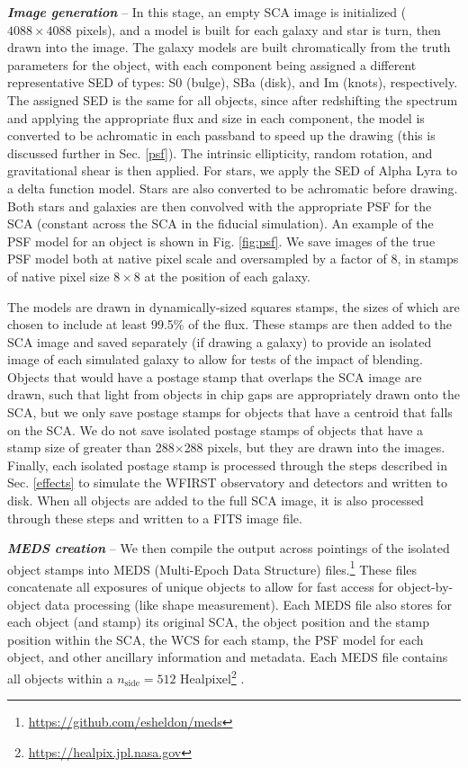 \documentclass[aps,prd, amsmath,amssymb,superscriptaddress,showkeys,nofootinbib,reprint,preprintnumbers]{revtex4-1}
\begin{document}
\textbf{\textit{Image generation}} -- In this stage, an empty SCA image is initialized ($4088\times4088$ pixels), and a model is built for each galaxy and star is turn, then drawn into the image. 
The galaxy models are built chromatically from the truth parameters for the object, with each component being assigned a different representative SED of types: S0 (bulge), SBa (disk), and Im (knots), respectively. 
The assigned SED is the same for all objects, since after redshifting the spectrum and applying the appropriate flux and size in each component, the model is converted to be achromatic in each passband to speed up the drawing (this is discussed further in Sec. \ref{psf}). 
The intrinsic ellipticity, random rotation, and gravitational shear is then applied.
For stars, we apply the SED of Alpha Lyra to a delta function model. 
Stars are also converted to be achromatic before drawing.
Both stars and galaxies are then convolved with the appropriate PSF for the SCA (constant across the SCA in the fiducial simulation). An example of the PSF model for an object is shown in Fig. \ref{fig:psf}. We save images of the true PSF model both at native pixel scale and oversampled by a factor of 8, in stamps of native pixel size $8\times 8$ at the position of each galaxy.

The models are drawn in dynamically-sized squares stamps, the sizes of which are chosen to include at least 99.5\% of the flux.
These stamps are then added to the SCA image and saved separately (if drawing a galaxy) to provide an isolated image of each simulated galaxy to allow for tests of the impact of blending.
Objects that would have a postage stamp that overlaps the SCA image are drawn, such that light from objects in chip gaps are appropriately drawn onto the SCA, but we only save postage stamps for objects that have a centroid that falls on the SCA. 
We do not save isolated postage stamps of objects that have a stamp size of greater than 288$\times$288 pixels, but they are drawn into the images.
Finally, each isolated postage stamp is processed through the steps described in Sec. \ref{effects} to simulate the WFIRST observatory and detectors and written to disk. When all objects are added to the full SCA image, it is also processed through these steps and written to a FITS image file.

\textbf{\textit{MEDS creation}} -- We then compile the output across pointings of the isolated object stamps into MEDS (Multi-Epoch Data Structure) files.\footnote{\url{https://github.com/esheldon/meds}}
These files concatenate all exposures of unique objects to allow for fast access for object-by-object data processing (like shape measurement). 
Each MEDS file also stores for each object (and stamp) its original SCA, the object position and the stamp position within the SCA, the WCS for each stamp, the PSF model for each object, and other ancillary information and metadata.
Each MEDS file contains all objects within a $n_{\textrm{side}}=512$ Healpixel\footnote{\url{https://healpix.jpl.nasa.gov}} \cite{2005ApJ...622..759G,Zonca2019}.
\end{document}

